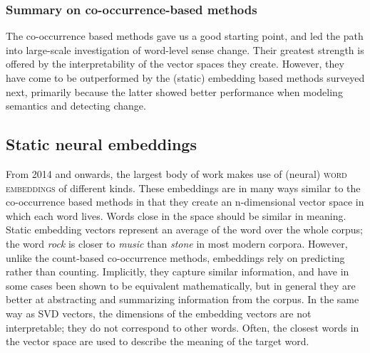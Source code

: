 \documentclass[output=paper]{langsci/langscibook}
\begin{document}
\subsubsection{Summary on co-occurrence-based methods} The co-occurrence based methods gave us a good starting point, and led the path into large-scale investigation of word-level sense change. Their greatest strength is offered by the interpretability of the vector spaces they create. However, they have come to be outperformed by the (static) embedding based methods surveyed next, primarily because the latter showed better performance when modeling semantics and detecting change.
 
 \subsection{Static neural embeddings} \label{sec:NeurEmb} 
     From 2014 and onwards, the largest body of work makes use of (neural) \textsc{word embeddings} of different kinds. 
   These embeddings are in many ways similar to the co-occurrence based methods in that they create an n-dimensional vector space in which each word lives. Words close in the space should be similar in meaning. Static embedding vectors represent an average of the word over the whole corpus; the word \textit{rock} is  closer to \textit{music} than \textit{stone} in most modern corpora. However, unlike the count-based co-occurrence methods, embeddings rely on predicting rather than counting. Implicitly, they capture similar information, and have in some cases been shown to be equivalent mathematically, but in general they are better at abstracting and summarizing information from the corpus.  In the same way as SVD vectors, the dimensions of the embedding vectors are not interpretable; they do not correspond to other words. Often, the closest words in the vector space are used to describe the meaning of the target word. 
\end{document}
